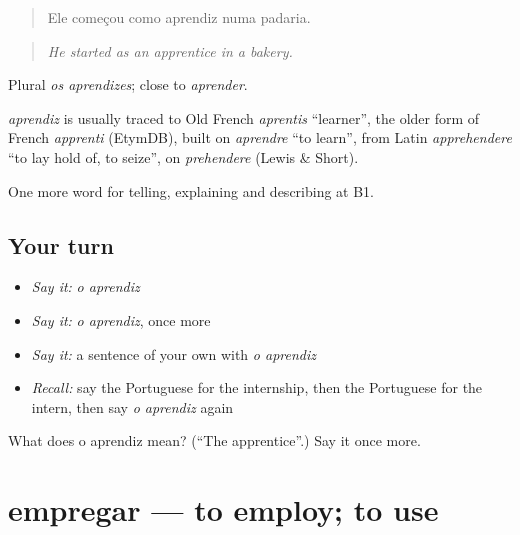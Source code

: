 \begin{quote}
Ele começou como aprendiz numa padaria.
\end{quote}

\begin{quote}
\emph{He started as an apprentice in a bakery.}
\end{quote}

Plural \emph{os aprendizes}; close to \emph{aprender}.

\begin{cousinweb}
\emph{aprendiz} is usually traced to Old French \emph{aprentis} \textquotedblleft{}learner\textquotedblright{}, the older form of French \emph{apprenti} (EtymDB), built on \emph{aprendre} \textquotedblleft{}to learn\textquotedblright{}, from Latin \emph{apprehendere} \textquotedblleft{}to lay hold of, to seize\textquotedblright{}, on \emph{prehendere} (Lewis \& Short).
\end{cousinweb}

\begin{grammarlens}[title={What you've built}]
One more word for telling, explaining and describing at B1.
\end{grammarlens}

\subsection*{Your turn}
\begin{itemize}
\raggedright
  \item \emph{Say it:} \emph{o aprendiz}
  \item \emph{Say it:} \emph{o aprendiz}, once more
  \item \emph{Say it:} a sentence of your own with \emph{o aprendiz}
  \item \emph{Recall:} say the Portuguese for the internship, then the Portuguese for the intern, then say \emph{o aprendiz} again
\end{itemize}

\begin{tcolorbox}[breakable,colback=teal!4,colframe=teal!35!black,title={Before you move on}]
What does o aprendiz mean? (\textquotedblleft{}The apprentice\textquotedblright{}.) Say it once more.
\end{tcolorbox}
\section[empregar]{empregar — to employ; to use}

\label{lesson:PT-C357-empregar}



